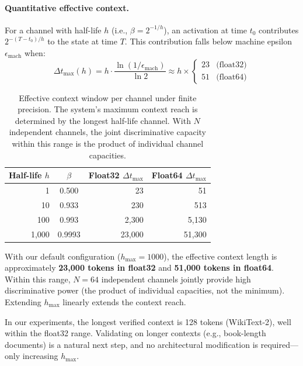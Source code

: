 \documentclass[11pt]{article}
\begin{document}
\paragraph{Quantitative effective context.}
For a channel with half-life $h$ (i.e., $\beta = 2^{-1/h}$), an activation at time $t_0$ contributes $2^{-(T-t_0)/h}$ to the state at time $T$. This contribution falls below machine epsilon $\epsilon_{\text{mach}}$ when:
\begin{equation}
\Delta t_{\max}(h) = h \cdot \frac{\ln(1/\epsilon_{\text{mach}})}{\ln 2} \approx h \times \begin{cases} 23 & \text{(float32)} \\ 51 & \text{(float64)} \end{cases}
\label{eq:context}
\end{equation}

\begin{table}[h]
\centering
\small
\begin{tabular}{r c r r}
\toprule
Half-life $h$ & $\beta$ & Float32 $\Delta t_{\max}$ & Float64 $\Delta t_{\max}$ \\
\midrule
1 & 0.500 & 23 & 51 \\
10 & 0.933 & 230 & 513 \\
100 & 0.993 & 2,300 & 5,130 \\
1,000 & 0.9993 & 23,000 & 51,300 \\
\bottomrule
\end{tabular}
\caption{Effective context window per channel under finite precision. The system's maximum context reach is determined by the longest half-life channel. With $N$ independent channels, the joint discriminative capacity within this range is the product of individual channel capacities.}
\label{tab:context}
\end{table}

With our default configuration ($h_{\max} = 1000$), the effective context length is approximately \textbf{23,000 tokens in float32} and \textbf{51,000 tokens in float64}. Within this range, $N = 64$ independent channels jointly provide high discriminative power (the product of individual capacities, not the minimum). Extending $h_{\max}$ linearly extends the context reach.

In our experiments, the longest verified context is 128 tokens (WikiText-2), well within the float32 range. Validating on longer contexts (e.g., book-length documents) is a natural next step, and no architectural modification is required---only increasing $h_{\max}$.
\end{document}
